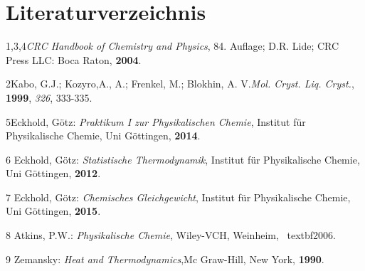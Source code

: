 \documentclass[12pt,a4paper,titlepage,headinclude,bibtotoc]{scrartcl}
\begin{document}
\newpage
\section{Literaturverzeichnis}

1,3,4\quad \emph{CRC Handbook of Chemistry and Physics}, 84. Auflage; D.R. Lide; CRC Press LLC: Boca Raton, \textbf{2004}.

2\quad Kabo, G.J.; Kozyro,A., A.; Frenkel, M.; Blokhin, A. V.\emph{Mol. Cryst. Liq. Cryst.}, \textbf{1999}, \emph{326}, 333-335.

5\quad Eckhold, Götz: \emph{Praktikum I zur Physikalischen Chemie}, Institut für Physikalische Chemie, Uni Göttingen, \textbf{2014}.

\vspace{0,5 cm}

6 \quad Eckhold, Götz: \emph{Statistische Thermodynamik}, Institut für Physikalische Chemie, Uni Göttingen, \textbf{2012}.

\vspace{0,5cm}

7 \quad Eckhold, Götz: \emph{Chemisches Gleichgewicht}, Institut für Physikalische Chemie, Uni Göttingen, \textbf{2015}.\\

\vspace{0,5cm}

8 \quad Atkins, P.W.: \emph{Physikalische Chemie}, Wiley-VCH, Weinheim, \
 textbf{2006}.\\

\vspace{0,5cm}

9 \quad Zemansky: \emph{Heat and Thermodynamics},Mc Graw-Hill, New York, \textbf{1990}.\\
\end{document}
